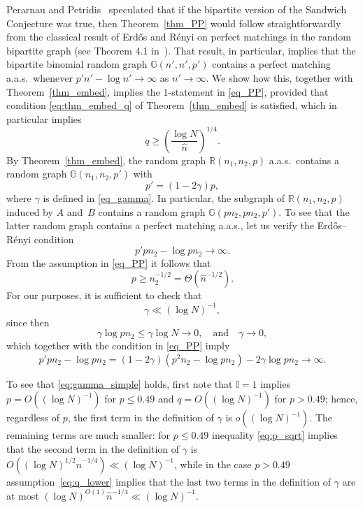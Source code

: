 \documentclass[12pt,reqno]{amsart}
\newcommand{\R} {\mathbb R}
\newcommand{\Rnnp}{\R(n_1,n_2,p)}
\newcommand{\G} {\mathbb G}
\newcommand{\I} {\mathbb I}
\theoremstyle{definition}
\begin{document}
Perarnau and Petridis~\cite{PePe} speculated that if the bipartite version of the Sandwich Conjecture was true, then Theorem~\ref{thm_PP} would follow straightforwardly from the classical result of Erd\H os and R\'enyi on perfect matchings in the random bipartite graph (see Theorem 4.1 in~\cite{JLR}). That result, in particular, implies that the bipartite binomial random graph $\G(n',n',p')$ contains a perfect matching a.a.s.\ whenever $p'n'-\log n'\to\infty$ as $n'\to\infty$. We show how this, together with Theorem~\ref{thm_embed}, implies the $1$-statement in \eqref{eq_PP}, provided that condition \eqref{eq:thm_embed_q} of Theorem~\ref{thm_embed} is satisfied, which in particular implies
\begin{equation}
  \label{eq:q_lower}
  q \ge \left( \frac{\log N}{\hat n} \right)^{1/4}.
\end{equation}
By Theorem~\ref{thm_embed}, the random graph $\Rnnp$ a.a.s.\ contains a random graph $\G(n_1,n_2,p')$ with
 \[
   p' =(1 - 2\gamma) p,
 \]
 where $\gamma$ is defined in \eqref{eq_gamma}. In particular, the subgraph of $\Rnnp$ induced by $A$ and~$B$ contains a random graph $\G(pn_2, pn_2, p')$.
 To see that the latter random graph contains a perfect matching a.a.s., let us verify the Erd\H{o}s--R\'enyi condition
 \begin{equation*}
 p'pn_2 - \log pn_2 \to \infty.
 \end{equation*}
 From the assumption in \eqref{eq_PP} it follows that
 \begin{equation}
   \label{eq:p_sqrt}
   p\geq n_2^{-1/2} = \Theta\left( \hat n^{-1/2} \right).
 \end{equation}
 For our purposes, it is sufficient to check that
 \begin{equation}
   \label{eq:gamma_simple}
   \gamma \ll (\log N)^{-1},
 \end{equation}
 since then
\begin{equation*}
  \gamma \log pn_2 \le \gamma \log N \to 0, \quad \text{and} \quad \gamma \to 0,
\end{equation*}
which together with the condition in \eqref{eq_PP} imply
\[
  p'pn_2 - \log pn_2 = (1 - 2\gamma)(p^2n_2 - \log pn_2) - 2\gamma \log pn_2 \to \infty.
\]

To see that \eqref{eq:gamma_simple} holds, first note that $\I = 1$ implies $p = O( (\log N)^{-1})$ for $p \le 0.49$ and $q = O( (\log N)^{-1})$ for $p > 0.49$; hence, regardless of $p$, the first term in the definition of $\gamma$ is $o\left( (\log N)^{-1} \right)$. The remaining terms are much smaller: for $p \le 0.49$ inequality \eqref{eq:p_sqrt} implies that the second term in the definition of $\gamma$ is $O\left( (\log N)^{1/2}\hat n^{-1/4} \right) \ll (\log N)^{-1}$, while in the case $p > 0.49$  assumption~\eqref{eq:q_lower} implies that the last two terms in the definition of $\gamma$ are at most  $(\log N)^{O(1)}\hat n^{-1/4} \ll (\log N)^{-1}$.
\end{document}
